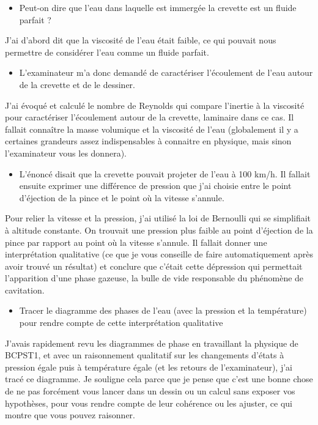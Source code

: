 \begin{itemize}
    \item Peut-on dire que l’eau dans laquelle est immergée la crevette est un fluide parfait ?
\end{itemize} 

J’ai d’abord dit que la viscosité de l’eau était faible, ce qui pouvait nous permettre de considérer l’eau comme un fluide parfait. 

\begin{itemize}
    \item L’examinateur m’a donc demandé de caractériser l’écoulement de l’eau autour de la crevette et de le dessiner.
\end{itemize}

 J’ai évoqué et calculé le nombre de Reynolds qui compare l’inertie à la viscosité pour caractériser l’écoulement autour de la crevette, laminaire dans ce cas. Il fallait connaître la masse volumique et la viscosité de l’eau (globalement il y a certaines grandeurs assez indispensables à connaitre en physique, mais sinon l’examinateur vous les donnera). 

\begin{itemize}
    \item L’énoncé disait que la crevette pouvait projeter de l’eau à 100 km/h. Il fallait ensuite exprimer une différence de pression que j’ai choisie entre le point d’éjection de la pince et le point où la vitesse s’annule.
\end{itemize} 

Pour relier la vitesse et la pression, j’ai utilisé la loi de Bernoulli qui se simplifiait à altitude constante. On trouvait une pression plus faible au point d’éjection de la pince par rapport au point où la vitesse s’annule. Il fallait donner une interprétation qualitative (ce que je vous conseille de faire automatiquement après avoir trouvé un résultat) et conclure que c’était cette dépression qui permettait l’apparition d’une phase gazeuse, la bulle de vide responsable du phénomène de cavitation. 

\begin{itemize}
    \item Tracer le diagramme des phases de l’eau (avec la pression et la température) pour rendre compte de cette interprétation qualitative
\end{itemize}

J’avais rapidement revu les diagrammes de phase en travaillant la physique de BCPST1, et avec un raisonnement qualitatif sur les changements d’états à pression égale puis à température égale (et les retours de l’examinateur), j’ai tracé ce diagramme. Je souligne cela parce que je pense que c’est une bonne chose de ne pas forcément vous lancer dans un dessin ou un calcul sans exposer vos hypothèses, pour vous rendre compte de leur cohérence ou les ajuster, ce qui montre que vous pouvez raisonner. 

